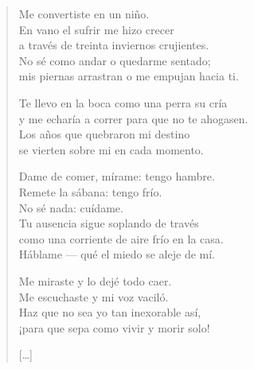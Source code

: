 \documentclass[11pt]{extbook}
\newcommand*{\centeredornament}{\centerline{\pgfornament[width=6cm]{88}}}
\begin{document}
\newpage


\vspace*{-15mm}
\centeredornament



\begin{verse}
  Me convertiste en un niño. \\
  En vano el sufrir me hizo crecer \\
  a través de treinta inviernos crujientes. \\
  No sé como andar o quedarme sentado; \\
  mis piernas arrastran o me empujan hacia ti.

  Te llevo en la boca como una perra su cría \\
  y me echaría a correr para que no te ahogasen.\hspace{-1mm} \\
  Los años que quebraron mi destino \\
  se vierten sobre mi en cada momento.

  Dame de comer, mírame: tengo hambre. \\
  Remete la sábana: tengo frío. \\
  No sé nada: cuídame. \\
  Tu ausencia sigue soplando de través \\
  como una corriente de aire frío en la casa. \\
  Háblame --- qué el miedo se aleje de mí.

  Me miraste y lo dejé todo caer. \\
  Me escuchaste y mi voz vaciló. \\
  Haz que no sea yo tan inexorable así, \\
  ¡para que sepa como vivir y morir solo!

  \hfill [\ldots]
\end{verse}

\newpage

\vspace*{-15mm}
\centeredornament


\end{document}

